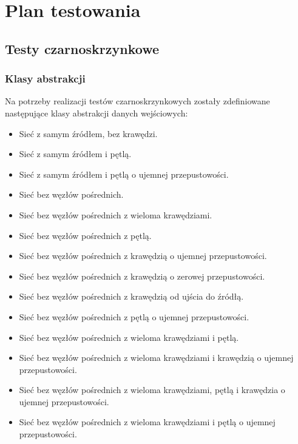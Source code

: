 \documentclass[10pt]{dokument-tiwo}
\begin{document}
\MakeDokumentMeta


\section{Plan testowania}
\subsection{Testy czarnoskrzynkowe}
\subsubsection{Klasy abstrakcji}
Na potrzeby realizacji testów czarnoskrzynkowych zostały zdefiniowane następujące klasy abstrakcji danych wejściowych:
\begin{itemize}
    \item Sieć z samym źródłem, bez krawędzi.
    \item Sieć z samym źródłem i pętlą.
    \item Sieć z samym źródłem i pętlą o ujemnej przepustowości.
\end{itemize}
\begin{itemize}
    \item Sieć bez węzłów pośrednich.
    \item Sieć bez węzłów pośrednich z wieloma krawędziami.
    \item Sieć bez węzłów pośrednich z pętlą.
    \item Sieć bez węzłów pośrednich z krawędzią o ujemnej przepustowości.
    \item Sieć bez węzłów pośrednich z krawędzią o zerowej przepustowości.
    \item Sieć bez węzłów pośrednich z krawędzią od ujścia do źródłą.
    \item Sieć bez węzłów pośrednich z pętlą o ujemnej przepustowości.
    \item Sieć bez węzłów pośrednich z wieloma krawędziami i pętlą.
    \item Sieć bez węzłów pośrednich z wieloma krawędziami i krawędzią o ujemnej przepustowości.
    \item Sieć bez węzłów pośrednich z wieloma krawędziami, pętlą i krawędzia o ujemnej przepustowości.
    \item Sieć bez węzłów pośrednich z wieloma krawędziami i pętlą o ujemnej przepustowości.   
\end{itemize}
\end{document}
